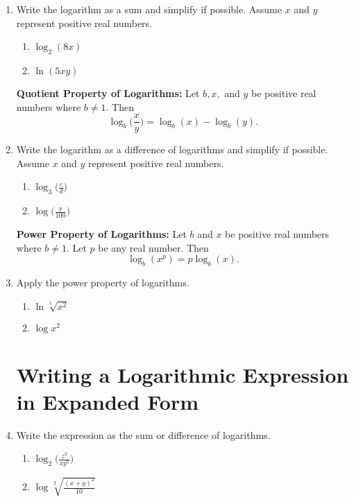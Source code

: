 \documentclass[11pt]{article}
\begin{document}
\begin{enumerate}
\item Write the logarithm as a sum and simplify if possible.  Assume $x$ and $y$ represent positive real numbers. \\
\begin{enumerate}
\item $\log_2 (8x)$\\[.2in]
\item $\ln (5xy)$\\[.2in]
\end{enumerate}

\noindent \textbf{Quotient Property of Logarithms:} Let $b, x,$ and $y$ be positive real numbers where $b \neq 1.$  Then $$\log_b \Bigg(\frac{x}{y}\Bigg)=\log_b (x) - \log_b(y).$$   



\item Write the logarithm as a difference of logarithms and simplify if possible.  Assume $x$ and $y$ represent positive real numbers. \\
\begin{enumerate}
\item $\displaystyle \log_3 \Bigg(\frac{c}{d}\Bigg)$\\[.2in]
\item $\displaystyle \log \Bigg(\frac{x}{100}\Bigg)$\\[.2in]
\end{enumerate}


\noindent \textbf{Power Property of Logarithms:} Let $b$ and $x$ be positive real numbers where $b \neq 1.$ Let $p$ be any real number. Then $$\log_b (x^p)=p \log_b (x).$$   



\item Apply the power property of logarithms. \\
\begin{enumerate}
\item $\displaystyle\ln \sqrt[5]{x^2}$\\[.2in]
\item $\displaystyle \log x^2$\\[.2in]
\end{enumerate}








\section{Writing a Logarithmic Expression in Expanded Form}
\item Write the expression as the sum or difference of logarithms.
\begin{enumerate}
\item $\displaystyle \log_2 \Bigg(\frac{z^3}{xy^5}\Bigg)$\vfill
\item $\displaystyle \log \sqrt[3]{\frac{(x+y)^2}{10}}$\vfill
\end{enumerate}


\end{enumerate}
\end{document}
